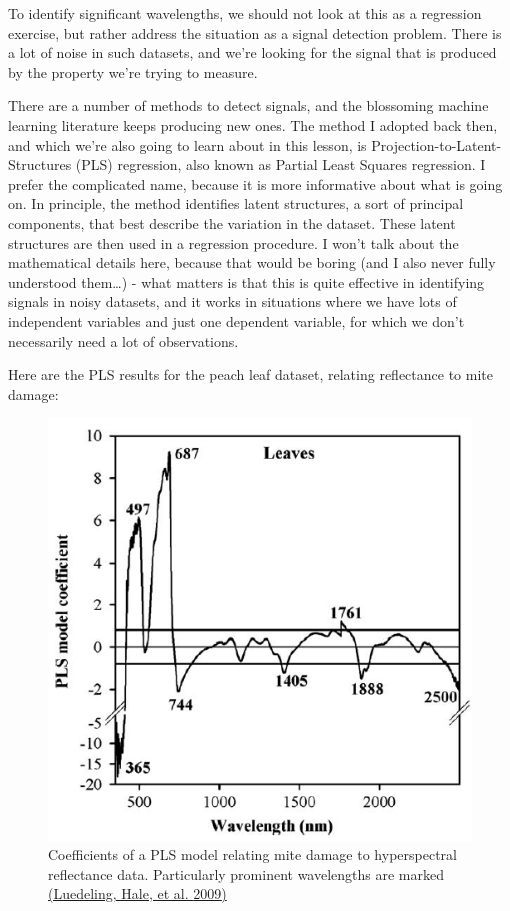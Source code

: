 \documentclass[
]{book}
\begin{document}
To identify significant wavelengths, we should not look at this as a regression exercise, but rather address the situation as a signal detection problem. There is a lot of noise in such datasets, and we're looking for the signal that is produced by the property we're trying to measure.

There are a number of methods to detect signals, and the blossoming machine learning literature keeps producing new ones. The method I adopted back then, and which we're also going to learn about in this lesson, is Projection-to-Latent-Structures (PLS) regression, also known as Partial Least Squares regression. I prefer the complicated name, because it is more informative about what is going on. In principle, the method identifies latent structures, a sort of principal components, that best describe the variation in the dataset. These latent structures are then used in a regression procedure. I won't talk about the mathematical details here, because that would be boring (and I also never fully understood them\ldots) - what matters is that this is quite effective in identifying signals in noisy datasets, and it works in situations where we have lots of independent variables and just one dependent variable, for which we don't necessarily need a lot of observations.

Here are the PLS results for the peach leaf dataset, relating reflectance to mite damage:

\begin{figure}
\centering
\includegraphics{pictures/mites_PLS.png}
\caption{Coefficients of a PLS model relating mite damage to hyperspectral reflectance data. Particularly prominent wavelengths are marked \href{https://www.sciencedirect.com/science/article/abs/pii/S0303243409000221}{(Luedeling, Hale, et al. \protect\hyperlink{ref-luedeling2009remote}{2009})}}
\end{figure}
\end{document}
